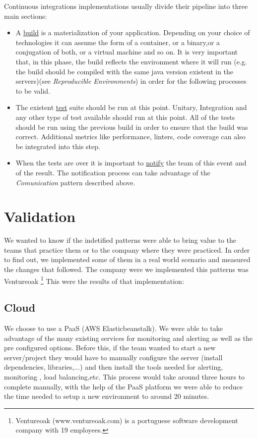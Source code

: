 \documentclass{llncs}
\begin{document}
			Continuous integrations implementations usually divide their pipeline into three main sections:
			\begin{itemize}
				\item A \underline{build} is a materialization of your application. Depending on your choice of technologies it can assume the form of a container, or a binary,or a conjugation of both, or a virtual machine and so on. It is very important that, in this phase, the build reflects the environment where it will run (e.g. the build should be compiled with the same java version existent in the servers)(see \textit{Reproducible Environments}) in order for the following processes to be valid.
				\item The existent \underline{test} suite should be run at this point. Unitary, Integration and any other type of test available should run at this point. All of the tests should be run using the previous build in order to ensure that the build was correct. Additional metrics like performance, linters, code coverage can also be integrated into this step.
				\item When the tests are over it is important to \underline{notify} the team of this event and of the result. The notification process can take advantage of the \textit{Comunication} pattern described above.
			\end{itemize}

\section{Validation}
We wanted to know if the indetified patterns were able to bring value to the teams that practice them or to the company where they were practiced. In order to find out, we implemented some of them in a real world scenario and measured the changes that followed.
The company were we implemented this patterns was Ventureoak \footnote{Ventureoak (www.ventureoak.com) is a portuguese software development company with 19 employees.} This were the results of that implementation:

  \subsection{Cloud}
  We choose to use a PaaS (AWS Elasticbeanstalk). We were able to take advantage of the many existing services for monitoring and alerting as well as the pre configured options. Before this, if the team wanted to start a new server/project they would have to manually configure the server (install dependencies, libraries,...) and then install the tools needed for alerting, monitoring , load balancing,etc. This process would take around three hours to complete manually, with the help of the PaaS platform we were able to reduce the time needed to setup a new environment to around 20 minutes.
\end{document}
